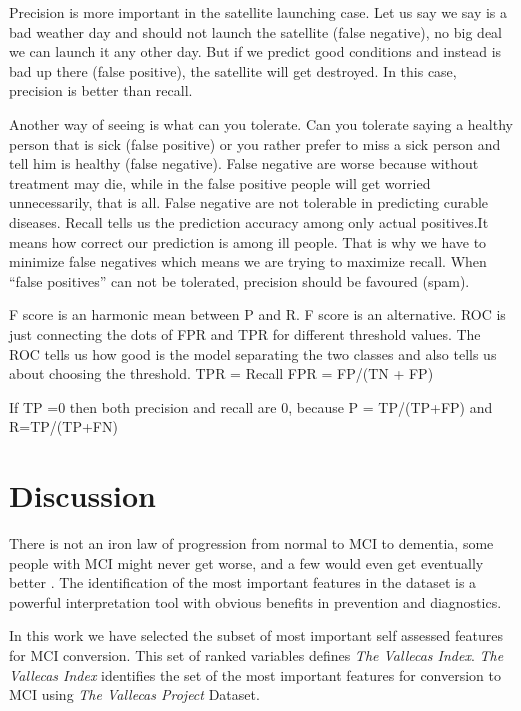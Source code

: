 \documentclass[preprint,12pt]{elsarticle}
\begin{document}
Precision is more important in the satellite launching case. Let us say we say is a bad weather day and should not launch the satellite (false negative), no big deal we can launch it any other day. But if we predict good conditions and instead is bad up there (false positive), the satellite will get destroyed. In this case, precision is better than recall.

Another way of seeing is what can you tolerate. Can you tolerate saying a healthy person that is sick (false positive) or you rather prefer to miss a sick person and tell him is healthy (false negative). False negative are worse because without treatment may die, while in the false positive people will get worried unnecessarily, that is all. False negative are not tolerable in predicting curable diseases.
Recall tells us the prediction accuracy among only actual positives.It means how correct our prediction is among ill people. That is why we have to minimize false negatives which means we are trying to maximize recall.
When “false positives” can not be tolerated, precision should be favoured (spam).

F score is an harmonic mean between P and R. F score is an alternative. 
ROC is just connecting the dots of FPR and TPR for different threshold values. The ROC tells us how good is the model separating the two classes and also tells us about choosing the threshold.
TPR = Recall
FPR = FP/(TN + FP)

If TP =0 then both precision and recall are 0, because P = TP/(TP+FP) and R=TP/(TP+FN)

\section{Discussion}
\label{se:dis}

There is not an iron law of progression from normal to MCI to dementia, some people with MCI might never get worse, and a few would even get eventually better \cite{avila2017subjective}. The identification of the most important features in the dataset is a powerful interpretation tool with obvious benefits in prevention and diagnostics. 

In this work we have selected the subset of most important self assessed features for MCI conversion. This set of ranked variables defines \emph{The Vallecas Index}. 
\emph{The Vallecas Index} identifies the set of the most important features for conversion to MCI using \emph{The Vallecas Project} Dataset. 
\end{document}
